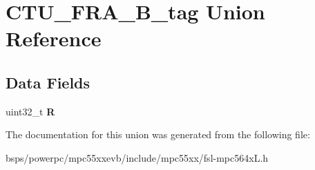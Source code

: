 \hypertarget{unionCTU__FRA__32B__tag}{}\section{C\+T\+U\+\_\+\+F\+R\+A\+\_\+B\+\_\+tag Union Reference}
\label{unionCTU__FRA__32B__tag}
\subsection*{Data Fields}
\begin{DoxyCompactItemize}
\item 
\mbox{\label{unionCTU__FRA__32B__tag_a3689d4e9540a860a8406563d36ec52c1}} 
uint32\+\_\+t {\bfseries R}
\end{DoxyCompactItemize}


The documentation for this union was generated from the following file\+:\begin{DoxyCompactItemize}
\item 
bsps/powerpc/mpc55xxevb/include/mpc55xx/fsl-\/mpc564x\+L.\+h\end{DoxyCompactItemize}
